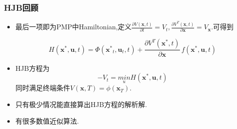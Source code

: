 \documentclass[UTF8, aspectratio=169, 9pt]{ctexbeamer}
\begin{document}
\begin{frame}
\frametitle{HJB回顾}
\begin{itemize}
  \item 最后一项即为PMP中Hamiltonian,定义$\frac{\partial V(\mathbf{x}, t)}{\partial t}=V_{t}, \frac{\partial V^{T}(\mathbf{x}, t)}{\partial \mathbf{x}}=V_{\mathbf{x}}$.可得到

      $$
      H(\boldsymbol{x}^*, \boldsymbol{u}, t) = \Phi(
      \boldsymbol{x^*}_t,  \boldsymbol{u}_t, t )  + \frac{
      \partial V^T ( \boldsymbol{x^*}, t  ) } { \partial
      \boldsymbol{x}  } \, f(\boldsymbol{x^*}, \boldsymbol{u}, t)
      $$
  \item HJB方程为
  $$
  - V_t = \underset{u}{min} H(\boldsymbol{x}^*, \boldsymbol{u}, t)
  $$
  同时满足终端条件$ V(\boldsymbol{x}, T) = \phi( \boldsymbol{x}_{T} )$.
  \item 只有极少情况能直接算出HJB方程的解析解.
  \item 有很多数值近似算法.
\end{itemize}
\end{frame}
\end{document}
